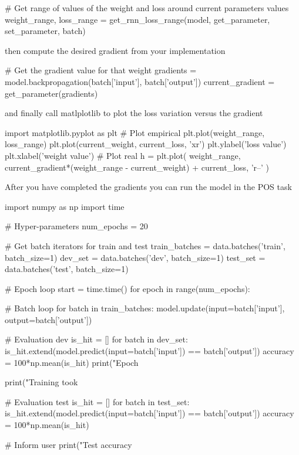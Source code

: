 \begin{exercise}
\begin{python}
# Get range of values of the weight and loss around current parameters values
weight_range, loss_range = get_rnn_loss_range(model, get_parameter, set_parameter, batch)
\end{python}
then compute the desired gradient from your implementation
\begin{python}
# Get the gradient value for that weight
gradients = model.backpropagation(batch['input'], batch['output'])
current_gradient = get_parameter(gradients)
\end{python}
and finally call matlplotlib to plot the loss variation versus the gradient
\begin{python}
import matplotlib.pyplot as plt
# Plot empirical
plt.plot(weight_range, loss_range)
plt.plot(current_weight, current_loss, 'xr')
plt.ylabel('loss value')
plt.xlabel('weight value')
# Plot real
h = plt.plot(
    weight_range,
    current_gradient*(weight_range - current_weight) + current_loss, 
    'r--'
)
\end{python}
\clearpage
\noindent After you have completed the gradients you can run the model in the POS task
\begin{python}
import numpy as np
import time

# Hyper-parameters
num_epochs = 20

# Get batch iterators for train and test
train_batches = data.batches('train', batch_size=1)
dev_set = data.batches('dev', batch_size=1)
test_set = data.batches('test', batch_size=1)

# Epoch loop
start = time.time()
for epoch in range(num_epochs):

    # Batch loop
    for batch in train_batches:
        model.update(input=batch['input'], output=batch['output'])

    # Evaluation dev
    is_hit = []
    for batch in dev_set:
        is_hit.extend(model.predict(input=batch['input']) == batch['output'])
    accuracy = 100*np.mean(is_hit)
    print("Epoch %

print("Training took %

# Evaluation test
is_hit = []
for batch in test_set:
    is_hit.extend(model.predict(input=batch['input']) == batch['output'])
accuracy = 100*np.mean(is_hit)

# Inform user
print("Test accuracy %
\end{python}
\end{exercise}

